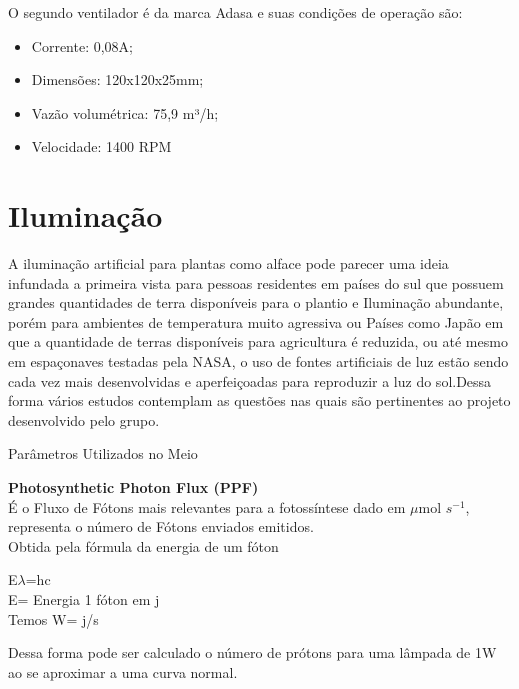O segundo ventilador é da marca Adasa e suas condições de operação são:

\begin{itemize}
	\item Corrente: 0,08A;
	\item Dimensões: 120x120x25mm;
	\item Vazão volumétrica: 75,9 m³/h;
	\item Velocidade: 1400 RPM 
\end{itemize}

\section{Iluminação}
A iluminação artificial para plantas como alface pode parecer uma ideia infundada a primeira vista para pessoas residentes em países do sul que possuem grandes quantidades de terra disponíveis para o plantio e Iluminação abundante, porém para ambientes de temperatura muito agressiva ou Países como Japão em que a quantidade de terras disponíveis para agricultura é reduzida, ou até mesmo em espaçonaves testadas pela NASA, o uso de fontes artificiais de luz estão sendo cada vez mais desenvolvidas e aperfeiçoadas para reproduzir a luz do sol.Dessa forma vários estudos contemplam as questões nas quais são pertinentes ao projeto desenvolvido pelo grupo.

Parâmetros Utilizados no Meio

\textbf{Photosynthetic Photon Flux (PPF)}\\
É o Fluxo de Fótons mais relevantes para a fotossíntese dado em $\mu$mol $s^{-1}$, representa o número de Fótons enviados emitidos. \\
Obtida pela fórmula da energia de um fóton

\begin{flushleft}
	
	E$\lambda$=hc \\
	E= Energia 1 fóton em j \\
	Temos W= j/s
	
\end{flushleft}

Dessa forma pode ser calculado o número de prótons para uma lâmpada de 1W ao se aproximar a uma curva normal.

